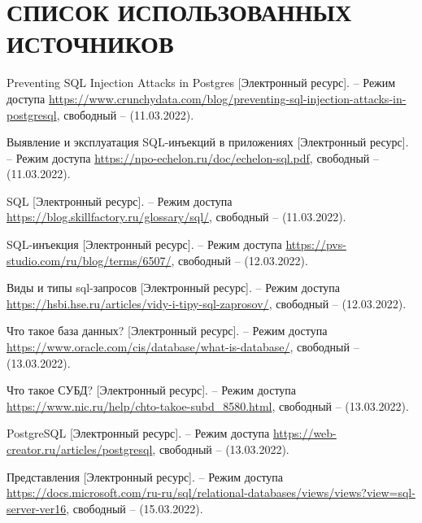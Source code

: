 \section*{СПИСОК ИСПОЛЬЗОВАННЫХ ИСТОЧНИКОВ}

\begingroup
\renewcommand{\section}[2]{}
\begin{thebibliography}{}


    Preventing SQL Injection Attacks in Postgres [Электронный ресурс]. – Режим доступа \url{https://www.crunchydata.com/blog/preventing-sql-injection-attacks-in-postgresql}, свободный – (11.03.2022).
    
    Выявление и эксплуатация SQL-инъекций в приложениях [Электронный ресурс]. – Режим доступа \url{https://npo-echelon.ru/doc/echelon-sql.pdf}, свободный – (11.03.2022).
    
    SQL [Электронный ресурс]. – Режим доступа \url{https://blog.skillfactory.ru/glossary/sql/}, свободный – (11.03.2022).
    
    SQL-инъекция [Электронный ресурс]. – Режим доступа \url{https://pvs-studio.com/ru/blog/terms/6507/}, свободный – (12.03.2022).  
    
    Виды и типы sql-запросов [Электронный ресурс]. – Режим доступа \url{https://hsbi.hse.ru/articles/vidy-i-tipy-sql-zaprosov/}, свободный – (12.03.2022).  
    
    Что такое база данных? [Электронный ресурс]. – Режим доступа \url{https://www.oracle.com/cis/database/what-is-database/}, свободный – (13.03.2022).      

    Что такое СУБД? [Электронный ресурс]. – Режим доступа \url{https://www.nic.ru/help/chto-takoe-subd_8580.html}, свободный – (13.03.2022).     

    PostgreSQL [Электронный ресурс]. – Режим доступа \url{https://web-creator.ru/articles/postgresql}, свободный – (13.03.2022). 
    
    Представления [Электронный ресурс]. – Режим доступа \url{https://docs.microsoft.com/ru-ru/sql/relational-databases/views/views?view=sql-server-ver16}, свободный – (15.03.2022). 
    

\end{thebibliography}
